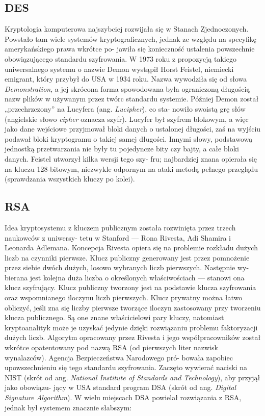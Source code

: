 \documentclass[a4paper]{article}
\begin{document}
\subsection{DES}
Kryptologia komputerowa najszybciej rozwijała się w Stanach Zjednoczonych. Powstało tam wiele
systemów kryptograficznych, jednak ze względu na specyfikę amerykańskiego prawa wkrótce po-
jawiła się konieczność ustalenia powszechnie obowiązującego standardu szyfrowania. W 1973 roku
z propozycją takiego uniwersalnego systemu o nazwie Demon wystąpił Horst Feistel, niemiecki
emigrant, który przybył do USA w 1934 roku. Nazwa wywodziła się od słowa \textit{Demonstration}, a jej
skrócona forma spowodowana była ograniczoną długością nazw plików w używanym przez twórc standardu systemie. Później Demon został „przechrzczony” na Lucyfera (ang. \textit{Lucipher}), co sta-
nowiło swoistą grę słów (angielskie słowo \textit{cipher} oznacza szyfr). Lucyfer był szyfrem blokowym, a
więc jako dane wejściowe przyjmował bloki danych o ustalonej długości, zaś na wyjściu podawał
bloki kryptogramu o takiej samej długości. Innymi słowy, podstawową jednostką przetwarzania
nie były tu pojedyncze bity czy bajty, a całe bloki danych. Feistel utworzył kilka wersji tego szy-
fru; najbardziej znana opierała się na kluczu 128-bitowym, niezwykle odpornym na ataki metodą
pełnego przeglądu (sprawdzania wszystkich kluczy po kolei).

\subsection{RSA}
Idea kryptosystemu z kluczem publicznym została rozwinięta przez trzech naukowców z uniwersy-
tetu w Stanford — Rona Rivesta, Adi Shamira i Leonarda Adlemana. Koncepcja Rivesta opiera
się na problemie rozkładu dużych liczb na czynniki pierwsze. Klucz publiczny generowany jest
przez pomnożenie przez siebie dwóch dużych, losowo wybranych liczb pierwszych. Następnie wy-
bierana jest kolejna duża liczba o określonych właściwościach — stanowi ona klucz szyfrujący.
Klucz publiczny tworzony jest na podstawie klucza szyfrowania oraz wspomnianego iloczynu liczb
pierwszych. Klucz prywatny można łatwo obliczyć, jeśli zna się liczby pierwsze tworzące iloczyn
zastosowany przy tworzeniu klucza publicznego. Są one znane właścicielowi pary kluczy, natomiast
kryptoanalityk może je uzyskać jedynie dzięki rozwiązaniu problemu faktoryzacji dużych liczb.
Algorytm opracowany przez Rivesta i jego współpracowników został wkrótce opatentowany pod
nazwą RSA (od pierwszych liter nazwisk wynalazców). Agencja Bezpieczeństwa Narodowego pró-
bowała zapobiec upowszechnieniu się tego standardu szyfrowania. Zaczęto wywierać naciski na
NIST (skrót od ang. \textit{National Institute of Standards and Technology}), aby przyjął jako obowiązu-
jący w USA standard program DSA (skrót od ang. \textit{Digital Signature Algorithm}).
W wielu miejscach DSA powielał rozwiązania z RSA, jednak był systemem znacznie słabszym:
\end{document}
